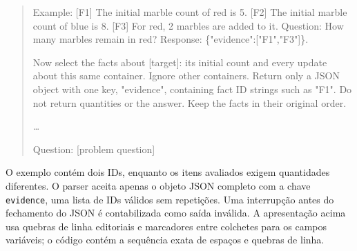 \documentclass[12pt,a4paper]{article}
\begin{document}
\begin{quote}\small\ttfamily
Example: [F1] The initial marble count of red is 5. [F2] The initial marble count of blue is 8. [F3] For red, 2 marbles are added to it. Question: How many marbles remain in red? Response: \{"evidence":["F1","F3"]\}.\par\medskip
Now select the facts about [target]: its initial count and every update about this same container. Ignore other containers. Return only a JSON object with one key, "evidence", containing fact ID strings such as "F1". Do not return quantities or the answer. Keep the facts in their original order.\par{}\par
[F2] [second visible fact]\par
\ldots\par
Question: [problem question]
\end{quote}
O exemplo contém dois IDs, enquanto os itens avaliados exigem quantidades diferentes. O parser aceita apenas o objeto JSON completo com a chave \texttt{evidence}, uma lista de IDs válidos sem repetições. Uma interrupção antes do fechamento do JSON é contabilizada como saída inválida. A apresentação acima usa quebras de linha editoriais e marcadores entre colchetes para os campos variáveis; o código contém a sequência exata de espaços e quebras de linha.
\end{document}
